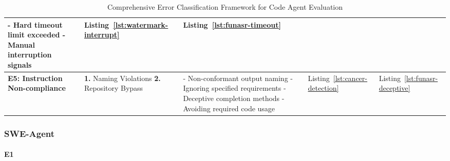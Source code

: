 \begin{table}[h]
{\begin{tabular}{l|p{4.8cm}|p{6.0cm}|p{1.8cm}|p{1.8cm}}
- Hard timeout limit exceeded \newline
- Manual interruption signals & 
Listing~\ref{lst:watermark-interrupt} & 
Listing~\ref{lst:funasr-timeout} \\
\hline
\textbf{E5: Instruction Non-compliance} & 
\textbf{1.} Naming Violations \newline
\textbf{2.} Repository Bypass & 
- Non-conformant output naming \newline
- Ignoring specified requirements \newline
- Deceptive completion methods \newline
- Avoiding required code usage & 
Listing~\ref{lst:cancer-detection} & 
Listing~\ref{lst:funasr-deceptive} \\
\hline
\end{tabular}%
}
\caption{Comprehensive Error Classification Framework for Code Agent Evaluation}
\end{table}



\subsubsection*{SWE-Agent}
\paragraph{E1}\label{swe-e1}

